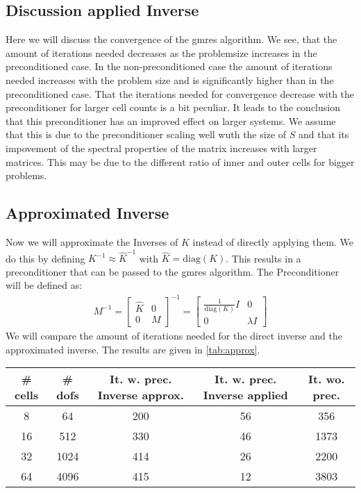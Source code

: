 \subsection{Discussion applied Inverse}
Here we will discuss the convergence of the gmres algorithm. We see, that the amount of iterations needed decreases as the problemsize increases in the preconditioned case. In the non-preconditioned case the amount of iterations needed increases with the problem size and is significantly higher than in the preconditioned case. That the iterations needed for convergence decrease with the preconditioner for larger cell counts is a bit peculiar. It leads to the conclusion that this preconditioner has an improved effect on larger systems. We assume that this is due to the preconditioner scaling well wuth the size of $S$ and that its impovement of the spectral properties of the matrix increases with larger matrices. This may be due to the different ratio of inner and outer cells for bigger problems. 

\subsection{Approximated Inverse}
Now we will approximate the Inverses of $K$ instead of directly applying them. We do this by defining $K^{-1} \approx \hat{K}^{-1}$ with $\hat{K} = \text{diag}(K)$. This results in a preconditioner that can be passed to the gmres algorithm. The Preconditioner will be defined as:
\begin{align}
    M^{-1} = \begin{bmatrix}
        \hat{K} & 0\\
        0 & M
    \end{bmatrix}^{-1} = \begin{bmatrix}
        \frac{1}{\text{diag}(K)} I & 0\\
        0 & \lambda I
    \end{bmatrix}
\end{align}
We will compare the amount of iterations needed for the direct inverse and the approximated inverse. The results are given in \autoref{tab:approx}.

\begin{center}
    \begin{tabular}{c|c|c|c|c}\label{tab:approx}
        \# cells & \# dofs &  It. w. prec. Inverse approx.& It. w. prec. Inverse applied & It. wo. prec. \\
        \hline
        8   &  64 & 200 &  56 & 356 \\
        16  &  512& 330 &  46 & 1373 \\
        32  & 1024& 414 &  26 & 2200 \\
        64  & 4096& 415 & 12  & 3803 \\
        \hline
    \end{tabular}
\end{center}

